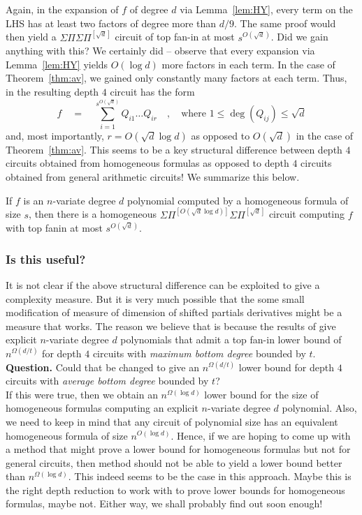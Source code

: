 \documentclass{beatcs}
\newcommand{\spaced}[1]{\quad#1\quad}
\newcommand{\SPSPfanin}[2]{\Sigma\Pi^{[#1]}\Sigma\Pi^{[#2]}}
\begin{document}
Again, in the expansion of $f$ of degree $d$ via Lemma~\ref{lem:HY}, every term on the LHS has at least two factors of degree more than $d/9$. The same proof would then yield a $\Sigma\Pi\Sigma\Pi^{[\sqrt{d}]}$ circuit of top fan-in at most $s^{O(\sqrt{d})}$. Did we gain anything with this? We certainly did -- observe that every expansion via Lemma~\ref{lem:HY} yields $O(\log d)$ more factors in each term. In the case of Theorem~\ref{thm:av}, we gained only constantly many factors at each term. Thus, in the resulting depth $4$ circuit has the form
\[
f \spaced{=} \sum_{i=1}^{s^{O(\sqrt{d})}} Q_{i1} \dots Q_{ir}\spaced{,}\text{where $1\leq \deg(Q_{ij})\leq \sqrt{d}$}
\]
and, most importantly, $r = O(\sqrt{d}\log d)$ as opposed to $O(\sqrt{d})$ in the case of Theorem~\ref{thm:av}. This seems to be a key structural difference between depth $4$ circuits obtained from homogeneous formulas as opposed to depth $4$ circuits obtained from general arithmetic circuits! We summarize this below. 

\begin{theorem}
If $f$ is an $n$-variate degree $d$ polynomial computed by a homogeneous formula of size $s$, then there is a homogeneous $\SPSPfanin{O(\sqrt{d}\log d)}{\sqrt{d}}$ circuit computing $f$ with top fanin at most $s^{O(\sqrt{d})}$. 
\end{theorem}

\subsubsection*{Is this useful?}

It is not clear if the above structural difference can be exploited to give a complexity measure. But it is very much possible that the some small modification of measure of dimension of shifted partials derivatives might be a measure that works. The reason we believe that is because the results of \cite{gkks13,KSS13,KS14a} give explicit $n$-variate degree $d$ polynomials that admit a top fan-in lower bound of $n^{\Omega(d/t)}$ for depth $4$ circuits with \emph{maximum bottom degree} bounded by $t$. \\

{\bf Question. }Could that be changed to give an $n^{\Omega(d/t)}$ lower bound for depth $4$ circuits with \emph{average bottom degree} bounded by $t$? \\

If this were true, then we obtain an $n^{\Omega(\log d)}$ lower bound for the size of homogeneous formulas computing an explicit $n$-variate degree $d$ polynomial. Also, we need to keep in mind that any circuit of polynomial size has an equivalent homogeneous formula of size $n^{O(\log d)}$. Hence, if we are hoping to come up with a method that might prove a lower bound for homogeneous formulas but not for general circuits, then method should not be able to yield a lower bound better than $n^{\Omega(\log d)}$. This indeed seems to be the case in this approach. Maybe this is the right depth reduction to work with to prove lower bounds for homogeneous formulas, maybe not. Either way, we shall probably find out soon enough!
\end{document}
